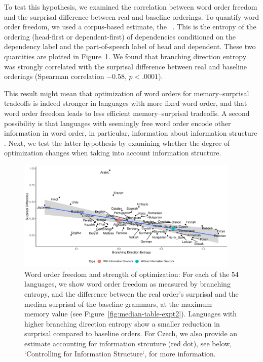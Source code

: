 To test this hypothesis, we examined the correlation between word order freedom and the surprisal difference between real and baseline orderings.
To quantify word order freedom, we used a corpus-based estimate, the ~\citep{futrell-quantifying-2015}.
This is the entropy of the ordering (head-first or dependent-first) of dependencies conditioned on the dependency label and the part-of-speech label of head and dependent.
These two quantities are plotted in Figure~\ref{fig:freedom-surp}.
We found that branching direction entropy was strongly correlated with the surprisal difference between real and baseline orderings (Spearman correlation $-0.58$, $p < .0001$).

This result might mean that optimization of word orders for memory--surprisal tradeoffs is indeed stronger in languages with more fixed word order, and that word order freedom leads to less efficient memory--surprisal tradeoffs.
A second possibility is that languages with seemingly free word order encode other information in word order, in particular, information about information structure \citep[e.g.][]{givon1988pragmatics,firbas1966defining,firbas1974aspects,myhill1985pragmatic}.
Next, we test the latter hypothesis by examining whether the degree of optimization changes when taking into account information structure.




\begin{figure}
\includegraphics[width=0.95\textwidth]{figures/surprisal-branching-entropy-REAL-infostruc-invert.pdf}
	\caption{Word order freedom and strength of optimization: For each of the 54 languages, we show word order freedom as measured by branching entropy, and the difference between the real order's surprisal and the median surprisal of the baseline grammars, at the maximum memory value (see Figure~\ref{fig:median-table-expt2}).
	Languages with higher branching direction entropy show a smaller reduction in surprisal compared to baseline orders.
	For Czech, we also provide an estimate accounting for information strcuture (red dot), see below, `Controlling for Information Structure`, for more information.
	}\label{fig:freedom-surp}
\end{figure}

